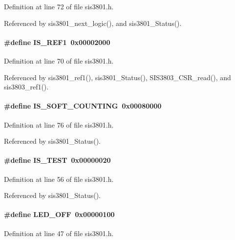 Definition at line 72 of file sis3801.h.

Referenced by sis3801\_\-next\_\-logic(), and sis3801\_\-Status().
\paragraph[{IS\_\-REF1}]{\setlength{\rightskip}{0pt plus 5cm}\#define IS\_\-REF1~0x00002000}\hfill\label{sis3801_8h_a6afdc5e84cf76ab272454aad24e9186e}


Definition at line 70 of file sis3801.h.

Referenced by sis3801\_\-ref1(), sis3801\_\-Status(), SIS3803\_\-CSR\_\-read(), and sis3803\_\-ref1().
\paragraph[{IS\_\-SOFT\_\-COUNTING}]{\setlength{\rightskip}{0pt plus 5cm}\#define IS\_\-SOFT\_\-COUNTING~0x00080000}\hfill\label{sis3801_8h_ae2cbd0cc3f1378acf69c9402286d1ac7}


Definition at line 76 of file sis3801.h.

Referenced by sis3801\_\-Status().
\paragraph[{IS\_\-TEST}]{\setlength{\rightskip}{0pt plus 5cm}\#define IS\_\-TEST~0x00000020}\hfill\label{sis3801_8h_a534a6da2752a735779d94aca808fc357}


Definition at line 56 of file sis3801.h.

Referenced by sis3801\_\-Status().
\paragraph[{LED\_\-OFF}]{\setlength{\rightskip}{0pt plus 5cm}\#define LED\_\-OFF~0x00000100}\hfill\label{sis3801_8h_a80700bb63bd56ebabbb4728aa433fd29}


Definition at line 47 of file sis3801.h.
